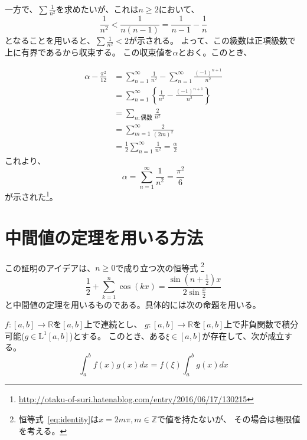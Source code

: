 \documentclass{jsarticle}
\begin{document}
一方で、$\sum\frac{1}{n^2}$を求めたいが、これは$n\geq 2$において、
\begin{equation}
	\frac{1}{n^{2}}<\frac{1}{n(n-1)}=\frac{1}{n-1}-\frac{1}{n}
\end{equation}
となることを用いると、$\sum\frac{1}{n^2}<2$が示される。
よって、この級数は正項級数で上に有界であるから収束する。
この収束値を$\alpha$とおく。このとき、

\begin{align}
	\alpha-\frac{\pi^{2}}{12}
	&=\sum_{n=1}^{\infty}\frac{1}{n^2}-\sum_{n=1}^{\infty}\frac{(-1)^{n+1}}{n^{2}}\\
	&=\sum_{n=1}^{\infty}\left\{\frac{1}{n^{2}}-\frac{(-1)^{n+1}}{n^{2}}\right\}\\
	&=\sum_{n:偶数}\frac{2}{n^{2}}\\
	&=\sum_{m=1}^{\infty}\frac{2}{(2m)^{2}}\\
	&=\frac{1}{2}\sum_{n=1}^{\infty}\frac{1}{n^{2}}=\frac{\alpha}{2}
\end{align}
これより、
\begin{equation}
	\alpha=\sum_{n=1}^{\infty}\frac{1}{n^{2}}=\frac{\pi^{2}}{6}
\end{equation}
が示された\footnote{\url{http://otaku-of-suri.hatenablog.com/entry/2016/06/17/130215}}。

\newpage

\section{中間値の定理を用いる方法}

この証明のアイデアは、$n\geq 0$で成り立つ次の恒等式
\footnote{恒等式~\eqref{eq:identity}は$x=2m\pi,m\in\mathbb{Z}$で値を持たないが、
その場合は極限値を考える。}
\begin{equation}
	\frac{1}{2}+\sum_{k=1}^{n}\cos(kx)=\frac{\sin\left(n+\frac{1}{2}\right)x}{2\sin\frac{x}{2}}
	\label{eq:identity}
\end{equation}
と中間値の定理を用いるものである。具体的には次の命題を用いる。
\begin{screen}
	$f:[a,b]\to\mathbb{R}$を$[a,b]$上で連続とし、
	$g:[a,b]\to\mathbb{R}$を$[a,b]$上で非負関数で積分可能($g\in\mathrm{L}^{1}[a,b]$)とする。
	このとき、ある$\xi\in[a,b]$が存在して、次が成立する。
	\begin{equation}
		\int_{a}^{b}f(x)g(x)dx=f(\xi)\int_{a}^{b}g(x)dx
	\end{equation}
\end{screen}
\end{document}
